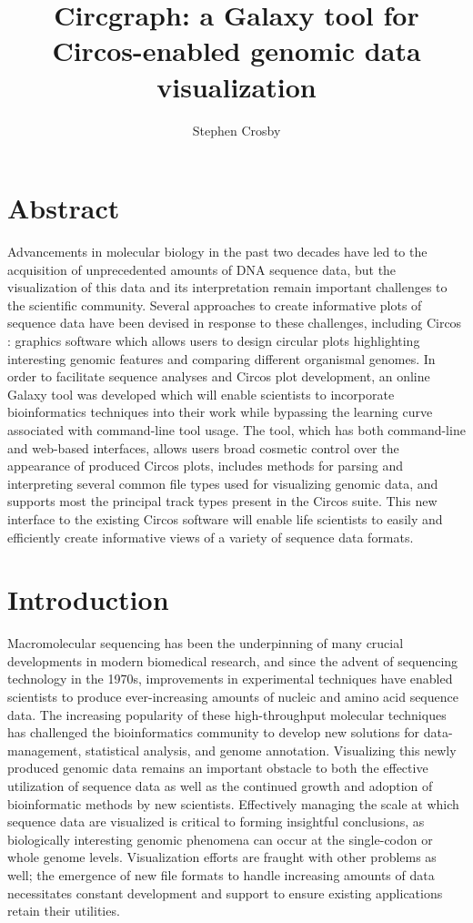 \documentclass[twocolumn]{article}
\title{Circgraph: a Galaxy tool for Circos-enabled genomic data visualization}
\author{Stephen Crosby}
\begin{document}
\maketitle
\section*{Abstract}
Advancements in molecular biology in the past two decades have led to the acquisition of
unprecedented amounts of DNA sequence data, but the visualization of this data and its
interpretation remain important challenges to the scientific community. Several approaches to
create informative plots of sequence data have been devised in response to these challenges, 
including Circos \cite{circospaper}: graphics software which allows users to design circular plots highlighting
interesting genomic features and comparing different organismal genomes. In order to facilitate sequence analyses and Circos plot development, an online Galaxy \cite{galaxypaper} tool was developed which
will enable scientists to incorporate bioinformatics techniques into their work while bypassing the learning curve associated with command-line tool usage. The tool, which has both command-line and web-based interfaces, allows users broad cosmetic control over the appearance of produced Circos plots, includes methods for parsing and interpreting several common file types used for visualizing genomic data, and supports most the principal track types present in the Circos suite. This new interface to the existing Circos software will enable life scientists to easily and efficiently create informative views of a variety of sequence data formats.

\section*{Introduction}
Macromolecular sequencing has been the underpinning of many crucial developments in modern biomedical research, and since the advent of sequencing technology in the 1970s, improvements in experimental techniques have enabled scientists to produce ever-increasing amounts of nucleic and amino acid sequence data. The increasing popularity of these high-throughput molecular techniques has challenged the bioinformatics community to develop new solutions for data-management, statistical analysis, and genome annotation.\cite{challenge} Visualizing this newly produced genomic data remains an important obstacle to both the effective utilization of sequence data as well as the continued growth and adoption of bioinformatic methods by new scientists.\cite{challenge} Effectively managing the scale at which sequence data are visualized is critical to forming insightful conclusions, as biologically interesting genomic phenomena can occur at the single-codon or whole genome levels.\cite{challenge} Visualization efforts are fraught with other problems as well; the emergence of new file formats to handle increasing amounts of data necessitates constant development and support to ensure existing applications retain their utilities.\cite{challenge}
\end{document}
